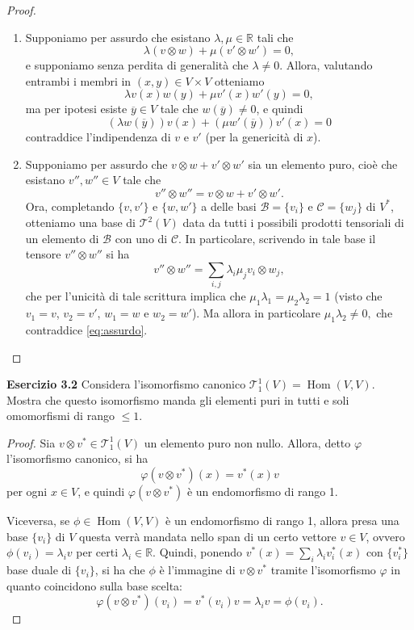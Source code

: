\documentclass[a4paper]{article}
\newcommand{\R}{\mathbb{R}}
\newcommand{\Hom}{\operatorname{Hom}}
\theoremstyle{definition}
\theoremstyle{definition}
\theoremstyle{remark}
\theoremstyle{definition}
\begin{document}
\begin{proof}\

    \begin{enumerate}
        \item Supponiamo per assurdo che esistano $\lambda,\mu\in\R$ tali che
              \[
                  \lambda(v\otimes w) + \mu(v'\otimes w') = 0,
              \]
              e supponiamo senza perdita di generalità che $\lambda\neq 0$. Allora, valutando entrambi i membri in $(x,y)\in V\times V$ otteniamo
              \[
                  \lambda v(x) w(y) + \mu v'(x) w'(y) = 0,
              \]
              ma per ipotesi esiste $\overline{y}\in V$ tale che $w(\overline{y})\neq 0$, e quindi
              \[
                  (\lambda w(\overline{y})) v(x) + (\mu w'(\overline{y})) v'(x) = 0
              \]
        contraddice l'indipendenza di $v$ e $v'$ (per la genericità di $x$).
        \item Supponiamo per assurdo che $v\otimes w + v'\otimes w'$ sia un elemento puro, cioè che esistano $v'',w''\in V$ tale che
              \begin{equation}\label{eq:assurdo}
                  v''\otimes w'' = v\otimes w + v'\otimes w' .
              \end{equation}
              Ora, completando $\{v,v'\}$ e $\{w,w'\}$ a delle basi $\mathcal{B}=\{v_i\}$ e $\mathcal{C}=\{w_j\}$ di $V^*$, otteniamo una base di $\mathcal{T}^2(V)$ data da tutti i possibili prodotti tensoriali di
              un elemento di $\mathcal{B}$ con uno di $\mathcal{C}$. In particolare, scrivendo in tale base il tensore $v''\otimes w''$ si ha
              \[
               v''\otimes w'' = \sum_{i,j} \lambda_i\mu_j v_i\otimes w_j,
              \]
              che per l'unicità di tale scrittura implica che $\mu_1\lambda_1 = \mu_2\lambda_2 = 1$ (visto che $v_1 = v$, $v_2 = v'$, $w_1 = w$ e $w_2 = w'$). Ma allora in
              particolare \(
              \mu_1\lambda_2\neq0 ,\) che contraddice \eqref{eq:assurdo}.
    \end{enumerate}
\end{proof}
\textbf{Esercizio 3.2}
Considera l'isomorfismo canonico $\mathcal{T}_1^1(V) = \Hom(V,V)$. Mostra che questo isomorfismo manda gli elementi puri in tutti e soli omomorfismi di rango $\leq 1$.
\begin{proof}
    Sia $v\otimes v^*\in\mathcal{T}_1^1(V)$ un elemento puro non nullo. Allora, detto $\varphi$ l'isomorfismo canonico, si ha
    \[
        \varphi(v\otimes v^*)(x) = v^*(x)v
    \]
    per ogni $x\in V$, e quindi $\varphi(v\otimes v^*)$ è un endomorfismo di rango 1.

    Viceversa, se $\phi\in\Hom(V,V)$ è un endomorfismo di rango 1, allora presa una base $\{v_i\}$ di $V$ questa verrà mandata nello span
    di un certo vettore $v\in V$, ovvero $\phi(v_i) = \lambda_i v$ per certi $\lambda_i\in\R$.
    Quindi, ponendo $v^*(x) = \sum_i \lambda_i v_i^*(x)$ con $\{v_i^*\}$ base duale di $\{v_i\}$, si ha che $\phi$ è l'immagine di $v\otimes v^*$ tramite l'isomorfismo $\varphi$ in
    quanto coincidono sulla base scelta:
    \[
        \varphi(v\otimes v^*)(v_i) = v^*(v_i)v = \lambda_i v = \phi(v_i).
    \]
\end{proof}
\end{document}
